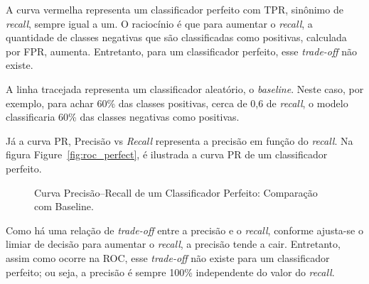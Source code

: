 A curva vermelha representa um classificador perfeito com TPR, sinônimo de \textit{recall}, sempre igual a um. O raciocínio é que 
para aumentar o \textit{recall}, a quantidade de classes negativas que são classificadas como positivas, calculada por FPR, aumenta. 
Entretanto, para um classificador perfeito, esse \textit{trade-off} não existe.

A linha tracejada representa um classificador aleatório, o \textit{baseline}. Neste caso, por exemplo, para achar 60\% das classes positivas,
cerca de 0,6 de \textit{recall}, o modelo classificaria 60\%  das classes negativas como positivas.

Já a curva PR, Precisão vs \textit{Recall} representa a precisão em função do \textit{recall}. Na figura Figure~\ref{fig:roc_perfect},
é ilustrada a curva PR de um classificador perfeito.

\pgfplotsset{compat=1.18}

\begin{figure}[H]
    \centering
    \caption{Curva Precisão–Recall de um Classificador Perfeito: Comparação com Baseline.}
    
    \label{fig:pr_curve_perfect}
\end{figure}

Como há uma relação de \textit{trade-off} entre a precisão e o \textit{recall}, conforme ajusta-se o limiar de decisão para aumentar o \textit{recall},
a precisão tende a cair. Entretanto, assim como ocorre na ROC, esse \textit{trade-off} não existe para um classificador perfeito; ou seja, a precisão é 
sempre 100\% independente do valor do \textit{recall}.

